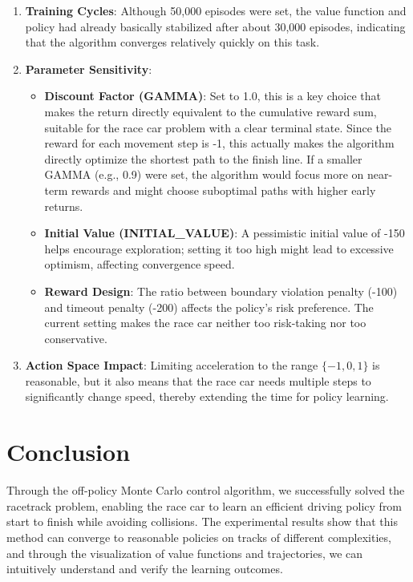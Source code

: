 \documentclass{article}
\begin{document}
\begin{enumerate}
    \item \textbf{Training Cycles}: Although 50,000 episodes were set, the value function and policy had already basically stabilized after about 30,000 episodes, indicating that the algorithm converges relatively quickly on this task.
    
    \item \textbf{Parameter Sensitivity}:
    \begin{itemize}
        \item \textbf{Discount Factor (GAMMA)}: Set to 1.0, this is a key choice that makes the return directly equivalent to the cumulative reward sum, suitable for the race car problem with a clear terminal state. Since the reward for each movement step is -1, this actually makes the algorithm directly optimize the shortest path to the finish line. If a smaller GAMMA (e.g., 0.9) were set, the algorithm would focus more on near-term rewards and might choose suboptimal paths with higher early returns.
        \item \textbf{Initial Value (INITIAL\_VALUE)}: A pessimistic initial value of -150 helps encourage exploration; setting it too high might lead to excessive optimism, affecting convergence speed.
        \item \textbf{Reward Design}: The ratio between boundary violation penalty (-100) and timeout penalty (-200) affects the policy's risk preference. The current setting makes the race car neither too risk-taking nor too conservative.
    \end{itemize}
    
    \item \textbf{Action Space Impact}: Limiting acceleration to the range \(\{-1, 0, 1\}\) is reasonable, but it also means that the race car needs multiple steps to significantly change speed, thereby extending the time for policy learning.
\end{enumerate}

\section{Conclusion}
Through the off-policy Monte Carlo control algorithm, we successfully solved the racetrack problem, enabling the race car to learn an efficient driving policy from start to finish while avoiding collisions. The experimental results show that this method can converge to reasonable policies on tracks of different complexities, and through the visualization of value functions and trajectories, we can intuitively understand and verify the learning outcomes.
\end{document}
